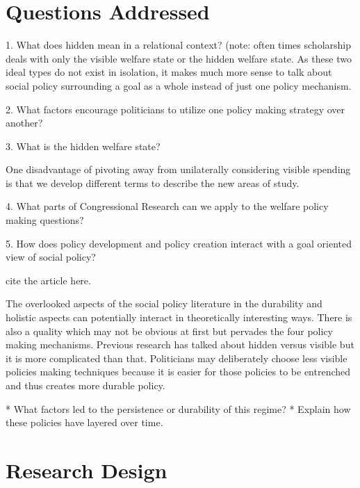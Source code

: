 \documentclass[12pt]{article}
\begin{document}
 
\section{Questions Addressed}

1. What does hidden mean in a relational context?
(note: often times scholarship deals with only the visible welfare state or the hidden welfare state. As these two ideal types do not exist in isolation, it makes much more sense to talk about social policy surrounding a goal as a whole instead of just one policy mechanism.

2. What factors encourage politicians to utilize one policy making strategy over another?

3. What is the hidden welfare state? 

One disadvantage of pivoting away from unilaterally considering visible spending is that we develop different terms to describe the new areas of study.

4. What parts of Congressional Research can we apply to the welfare policy making questions?

5. How does policy development and policy creation interact with a goal oriented view of social policy?

cite the \citep{pierson2004b} article here.

\citep{elving1996}


The overlooked aspects of the social policy literature in the durability and holistic aspects can potentially interact in theoretically interesting ways.
There is also a quality which may not be obvious at first but pervades the four policy making mechanisms. Previous research has talked about hidden versus visible but it is more complicated than that. Politicians may deliberately choose less visible policies making techniques because it is easier for those policies to be entrenched and thus creates more durable policy.

		* What factors led to the persistence or durability of this regime?
		* Explain how these policies have layered over time.


\section{Research Design}





\newpage
    {}


\end{document}
